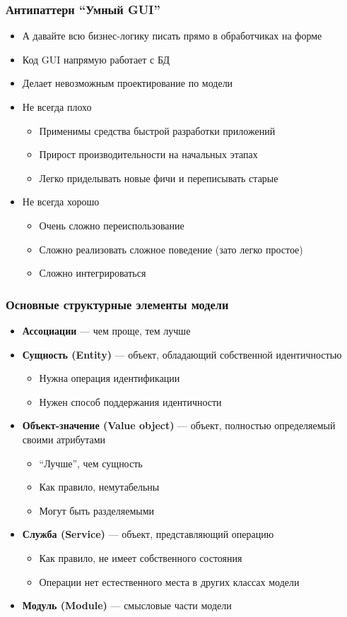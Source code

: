 \documentclass[xetex,mathserif,serif]{beamer}
\begin{document}
	\begin{frame}
		\frametitle{Антипаттерн ``Умный GUI''}
		\begin{itemize}
			\item А давайте всю бизнес-логику писать прямо в обработчиках на форме
			\item Код GUI напрямую работает с БД
			\item Делает невозможным проектирование по модели
			\item Не всегда плохо
			\begin{itemize}
				\item Применимы средства быстрой разработки приложений
				\item Прирост производительности на начальных этапах
				\item Легко приделывать новые фичи и переписывать старые
			\end{itemize}
			\item Не всегда хорошо
			\begin{itemize}
				\item Очень сложно переиспользование
				\item Сложно реализовать сложное поведение (зато легко простое)
				\item Сложно интегрироваться
			\end{itemize}
		\end{itemize}
	\end{frame}

	\begin{frame}
		\frametitle{Основные структурные элементы модели}
		\begin{itemize}
			\item \textbf{Ассоциации} --- чем проще, тем лучше
			\item \textbf{Сущность (Entity)} --- объект, обладающий собственной идентичностью
			\begin{itemize}
				\item Нужна операция идентификации
				\item Нужен способ поддержания идентичности
			\end{itemize}
			\item \textbf{Объект-значение (Value object)} --- объект, полностью определяемый своими атрибутами
			\begin{itemize}
				\item ``Лучше'', чем сущность
				\item Как правило, немутабельны
				\item Могут быть разделяемыми
			\end{itemize}
			\item \textbf{Служба (Service)} --- объект, представляющий операцию
			\begin{itemize}
				\item Как правило, не имеет собственного состояния
				\item Операции нет естественного места в других классах модели
			\end{itemize}
			\item \textbf{Модуль (Module)} --- смысловые части модели
		\end{itemize}
	\end{frame}
\end{document}
